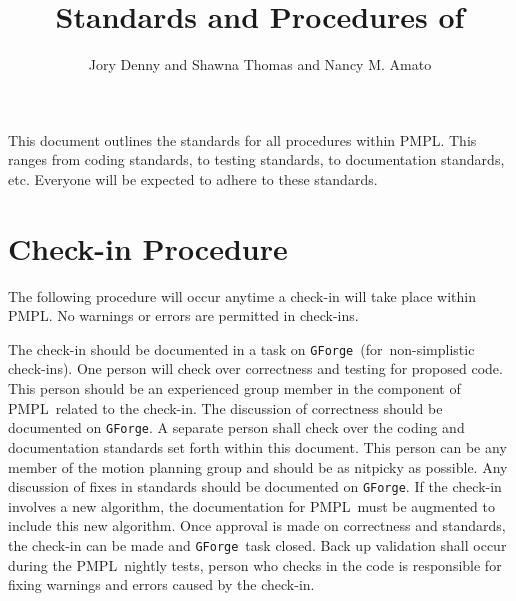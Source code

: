 \documentclass[12pt]{article}
\title{\Large \bf Standards and Procedures of \pmpl}
\author{Jory Denny and Shawna Thomas and Nancy M. Amato}
\newcommand{\pmpl}{PMPL}
\newcommand{\gforge}{\texttt{GForge}}
\begin{document}
\lstset{style=C++}

\maketitle
\thispagestyle{empty}
\pagestyle{empty}

This document outlines the standards for all procedures within \pmpl. This
ranges from coding standards, to testing standards, to documentation standards,
etc. Everyone will be expected to adhere to these standards.

\clearpage
\pagestyle{plain}


\section{Check-in Procedure}
The following procedure will occur anytime a check-in will take place within
\pmpl. No warnings or errors are permitted in check-ins.
\begin{algorithmic}[1]
\STATE The check-in should be documented in a task on \gforge\ (for\
non-simplistic check-ins).
\STATE One person will check over correctness and testing for proposed code.
This person should be an experienced group member in the component of \pmpl\
related to the check-in. The discussion of correctness should be documented on
\gforge.
\STATE A separate person shall check over the coding and documentation standards
set forth within this document. This person can be any member of the motion
planning group and should be as nitpicky as possible. Any discussion of fixes in
standards should be documented on \gforge.
\STATE If the check-in involves a new algorithm, the documentation for \pmpl\
must be augmented to include this new algorithm.
\STATE Once approval is made on correctness and standards, the check-in can be
made and \gforge\ task closed.
\STATE Back up validation shall occur during the \pmpl\ nightly tests, person
who checks in the code is responsible for fixing warnings and errors caused by
the check-in.
\end{algorithmic}

\end{document}
